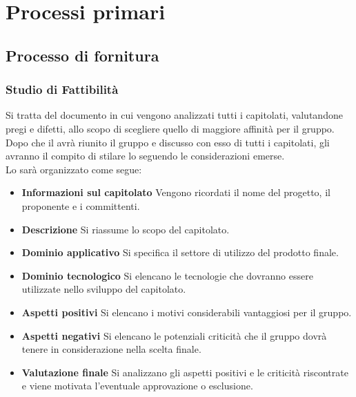 \section{Processi primari}
\subsection{Processo di fornitura}

\subsubsection{Studio di Fattibilità}
Si tratta del documento in cui vengono analizzati tutti i capitolati, valutandone pregi e difetti, allo scopo di scegliere quello di maggiore affinità per il gruppo.
Dopo che il \emph{\RdP} avrà riunito il gruppo e discusso con esso di tutti i capitolati, gli \emph{\anas} avranno il compito di stilare lo \emph{\SdF} 
seguendo le considerazioni emerse.\\
Lo \emph{\SdF} sarà organizzato come segue:
\begin{itemize}
	\item \textbf{Informazioni sul capitolato}
	Vengono ricordati il nome del progetto, il proponente e i committenti.
	\item \textbf{Descrizione}
	Si riassume lo scopo del capitolato.
	\item \textbf{Dominio applicativo}
	Si specifica il settore di utilizzo del prodotto finale.
	\item \textbf{Dominio tecnologico}
	Si elencano le tecnologie che dovranno essere utilizzate nello sviluppo del capitolato.
	\item \textbf{Aspetti positivi}
	Si elencano i motivi considerabili vantaggiosi per il gruppo.
	\item \textbf{Aspetti negativi}
	Si elencano le potenziali criticità che il gruppo dovrà tenere in considerazione nella scelta finale.
	\item \textbf{Valutazione finale}
	Si analizzano gli aspetti positivi e le criticità riscontrate e viene motivata l'eventuale approvazione o esclusione.
\end{itemize}

\begin{comment}
\subsubsection{Rapporti con il proponente}
Una volta scelto il capitolato, ci si dovrà confrontare con il proponente come segue:
\begin{itemize}
	\item \textbf{Primo contatto}
	Sfruttando i contatti messi a disposizione nella descrizione del capitolato, si contatta il proponente per verificarne l'effettiva disponibilità.
	\item \textbf{Definizione dei canali di comunicazione}
	Si dovrà concordare un metodo di comunicazione adatto ad entrambe le parti, per un confronto facile ed immediato tra fornitore e proponente.
\end{itemize}
\\
Confronto per le tecnologie da usare.
\end{comment}

